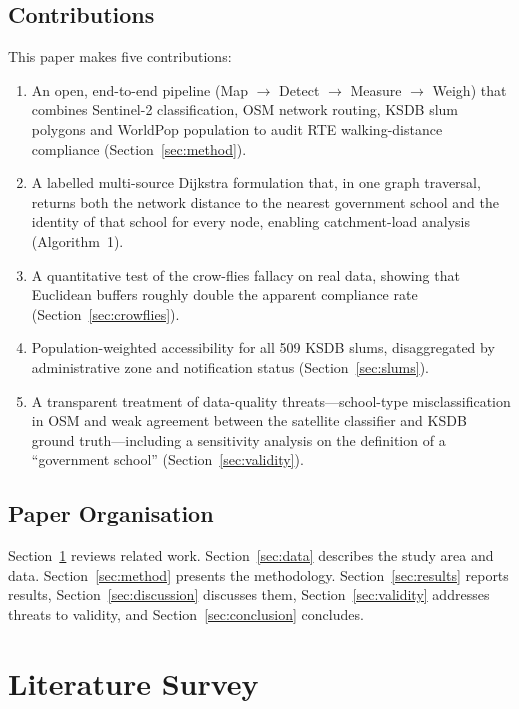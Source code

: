 \documentclass[conference]{IEEEtran}
\begin{document}
\subsection{Contributions}
This paper makes five contributions:
\begin{enumerate}
\item An open, end-to-end pipeline (Map $\rightarrow$ Detect $\rightarrow$ Measure $\rightarrow$ Weigh) that combines Sentinel-2 classification, OSM network routing, KSDB slum polygons and WorldPop population to audit RTE walking-distance compliance (Section~\ref{sec:method}).
\item A labelled multi-source Dijkstra formulation that, in one graph traversal, returns both the network distance to the nearest government school and the identity of that school for every node, enabling catchment-load analysis (Algorithm~1).
\item A quantitative test of the crow-flies fallacy on real data, showing that Euclidean buffers roughly double the apparent compliance rate (Section~\ref{sec:crowflies}).
\item Population-weighted accessibility for all 509 KSDB slums, disaggregated by administrative zone and notification status (Section~\ref{sec:slums}).
\item A transparent treatment of data-quality threats---school-type misclassification in OSM and weak agreement between the satellite classifier and KSDB ground truth---including a sensitivity analysis on the definition of a ``government school'' (Section~\ref{sec:validity}).
\end{enumerate}

\subsection{Paper Organisation}
Section~\ref{sec:lit} reviews related work. Section~\ref{sec:data} describes the study area and data. Section~\ref{sec:method} presents the methodology. Section~\ref{sec:results} reports results, Section~\ref{sec:discussion} discusses them, Section~\ref{sec:validity} addresses threats to validity, and Section~\ref{sec:conclusion} concludes.

\section{Literature Survey}\label{sec:lit}
\end{document}
